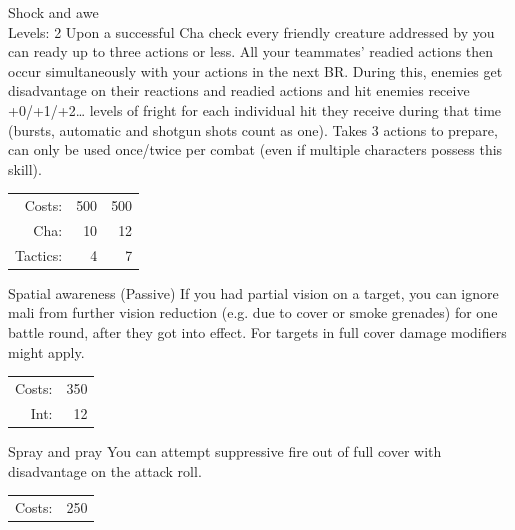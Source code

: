 \begin{skill}{Shock and awe \\\phantom{a}\hfill Levels: 2}
	\setlength{\parskip}{8pt}
	\setlength{\parindent}{0pt}
	Upon a successful Cha check every friendly creature addressed by you can ready up to three actions or less. All your teammates’ readied actions then occur simultaneously with your actions in the next BR. During this, enemies get disadvantage on their reactions and readied actions and hit enemies receive +0/+1/+2… levels of fright for each individual hit they receive during that time (bursts, automatic and shotgun shots count as one). Takes 3 actions to prepare, can only be used once/twice per combat (even if multiple characters possess this skill).\\

	\hfill
	\begin{tabular}{rrr}
		Costs: & 500 & 500 \\
		Cha: & 10 & 12 \\
		Tactics: & 4 & 7 \\
	\end{tabular}
\end{skill}

\begin{skill}{Spatial awareness (Passive)}
	\setlength{\parskip}{8pt}
	\setlength{\parindent}{0pt}
	If you had partial vision on a target, you can ignore mali from further vision reduction (e.g. due to cover or smoke grenades) for one battle round, after they got into effect. For targets in full cover damage modifiers might apply.\\

	\hfill
	\begin{tabular}{rr}
		Costs: & 350 \\
		Int: & 12 \\
	\end{tabular}
\end{skill}

\begin{skill}{Spray and pray}
	\setlength{\parskip}{8pt}
	\setlength{\parindent}{0pt}
	You can attempt suppressive fire out of full cover with disadvantage on the attack roll.\\

	\hfill
	\begin{tabular}{rr}
		Costs: & 250 \\
	\end{tabular}
\end{skill}

